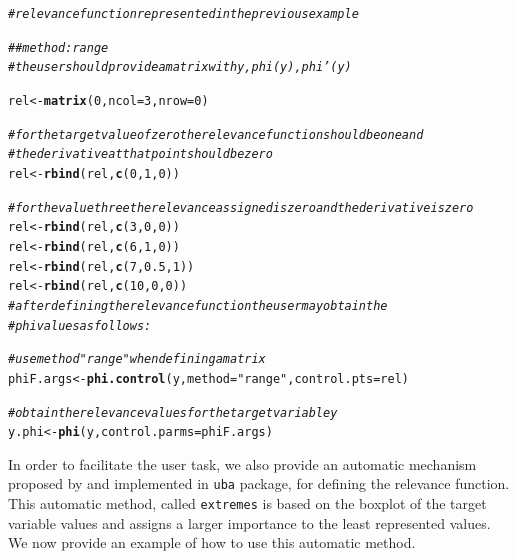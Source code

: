 \documentclass[10pt,a4paper]{article}\usepackage[]{graphicx}\usepackage[]{color}
\makeatletter
\newcommand{\hlnum}[1]{\textcolor[rgb]{0.686,0.059,0.569}{#1}}%
\newcommand{\hlstr}[1]{\textcolor[rgb]{0.192,0.494,0.8}{#1}}%
\newcommand{\hlcom}[1]{\textcolor[rgb]{0.678,0.584,0.686}{\textit{#1}}}%
\newcommand{\hlstd}[1]{\textcolor[rgb]{0.345,0.345,0.345}{#1}}%
\newcommand{\hlkwb}[1]{\textcolor[rgb]{0.69,0.353,0.396}{#1}}%
\newcommand{\hlkwc}[1]{\textcolor[rgb]{0.333,0.667,0.333}{#1}}%
\newcommand{\hlkwd}[1]{\textcolor[rgb]{0.737,0.353,0.396}{\textbf{#1}}}%
\newenvironment{kframe}{%
 \def\at@end@of@kframe{}%
 \ifinner\ifhmode%
  \def\at@end@of@kframe{\end{minipage}}%
  \begin{minipage}{\columnwidth}%
 \fi\fi%
 \def\FrameCommand##1{\hskip\@totalleftmargin \hskip-\fboxsep
 \colorbox{shadecolor}{##1}\hskip-\fboxsep
     \hskip-\linewidth \hskip-\@totalleftmargin \hskip\columnwidth}%
 \MakeFramed {\advance\hsize-\width
   \@totalleftmargin\z@ \linewidth\hsize
   \@setminipage}}%
 {\par\unskip\endMakeFramed%
 \at@end@of@kframe}
\newenvironment{knitrout}{}{} %
\makeatother
\begin{document}
\begin{knitrout}\footnotesize
{}\color{fgcolor}\begin{kframe}
\begin{alltt}
\hlcom{# relevance function represented in the previous example}

\hlcom{## method: range}
\hlcom{# the user should provide a matrix with y, phi(y), phi'(y)}

\hlstd{rel} \hlkwb{<-} \hlkwd{matrix}\hlstd{(}\hlnum{0}\hlstd{,}\hlkwc{ncol}\hlstd{=}\hlnum{3}\hlstd{,}\hlkwc{nrow}\hlstd{=}\hlnum{0}\hlstd{)}

\hlcom{# for the target value of zero the relevance function should be one and}
\hlcom{# the derivative at that point should be zero}
\hlstd{rel} \hlkwb{<-} \hlkwd{rbind}\hlstd{(rel,}\hlkwd{c}\hlstd{(}\hlnum{0}\hlstd{,}\hlnum{1}\hlstd{,}\hlnum{0}\hlstd{))}

\hlcom{# for the value three the relevance assigned is zero and the derivative is zero}
\hlstd{rel} \hlkwb{<-} \hlkwd{rbind}\hlstd{(rel,}\hlkwd{c}\hlstd{(}\hlnum{3}\hlstd{,}\hlnum{0}\hlstd{,}\hlnum{0}\hlstd{))}
\hlstd{rel} \hlkwb{<-} \hlkwd{rbind}\hlstd{(rel,}\hlkwd{c}\hlstd{(}\hlnum{6}\hlstd{,}\hlnum{1}\hlstd{,}\hlnum{0}\hlstd{))}
\hlstd{rel} \hlkwb{<-} \hlkwd{rbind}\hlstd{(rel,}\hlkwd{c}\hlstd{(}\hlnum{7}\hlstd{,}\hlnum{0.5}\hlstd{,}\hlnum{1}\hlstd{))}
\hlstd{rel} \hlkwb{<-} \hlkwd{rbind}\hlstd{(rel,}\hlkwd{c}\hlstd{(}\hlnum{10}\hlstd{,}\hlnum{0}\hlstd{,}\hlnum{0}\hlstd{))}
\hlcom{# after defining the relevance function the user may obtain the }
\hlcom{# phi values as follows:}

\hlcom{# use method "range" when defining a matrix}
\hlstd{phiF.args} \hlkwb{<-} \hlkwd{phi.control}\hlstd{(y,}\hlkwc{method}\hlstd{=}\hlstr{"range"}\hlstd{,}\hlkwc{control.pts}\hlstd{=rel)}

\hlcom{# obtain the relevance values for the target variable y}
\hlstd{y.phi} \hlkwb{<-} \hlkwd{phi}\hlstd{(y,}\hlkwc{control.parms}\hlstd{=phiF.args)}
\end{alltt}
\end{kframe}
\end{knitrout}

In order to facilitate the user task, we also provide an automatic mechanism proposed by \cite{ribeiro2011utility} and implemented in \texttt{uba} package, for defining the relevance function. This automatic method, called \texttt{extremes} is based on the boxplot of the target variable values and assigns a larger importance to the least represented values. We now provide an example of how to use this automatic method.
\end{document}
